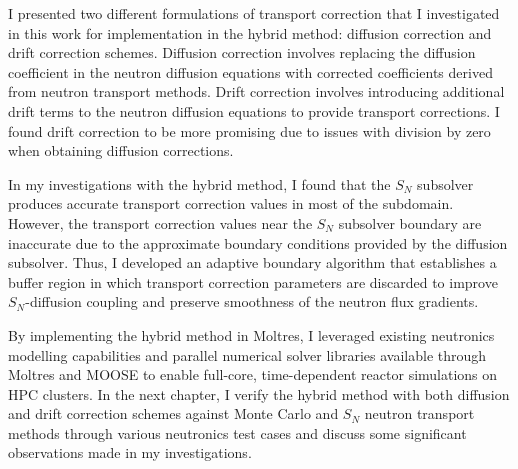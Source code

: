 I presented two different formulations of transport correction that I investigated in this work for
implementation in the hybrid method: diffusion correction and drift correction schemes. Diffusion
correction involves replacing the diffusion coefficient in the neutron diffusion equations with
corrected coefficients derived from neutron transport methods. Drift correction involves
introducing additional drift terms to the neutron diffusion equations to provide transport
corrections. I found drift correction to be more promising due to issues with division by zero when
obtaining diffusion corrections.

In my investigations with the hybrid method, I found that the $S_N$ subsolver produces
accurate transport correction values in most of the subdomain. However, the transport correction
values near the $S_N$ subsolver boundary are inaccurate due to the approximate boundary conditions
provided by the diffusion subsolver. Thus, I developed an adaptive boundary algorithm that
establishes a buffer region in which transport correction parameters are discarded to improve
$S_N$-diffusion coupling and preserve smoothness of the neutron flux gradients.

By implementing the hybrid method in Moltres, I leveraged existing neutronics modelling
capabilities and parallel numerical solver libraries available through Moltres and \gls{MOOSE} to
enable full-core, time-dependent reactor simulations on \gls{HPC} clusters.
In the next chapter, I verify the hybrid method with both diffusion and drift correction schemes
against Monte Carlo and $S_N$ neutron transport
methods through various neutronics test cases and discuss some significant observations made in my
investigations.
